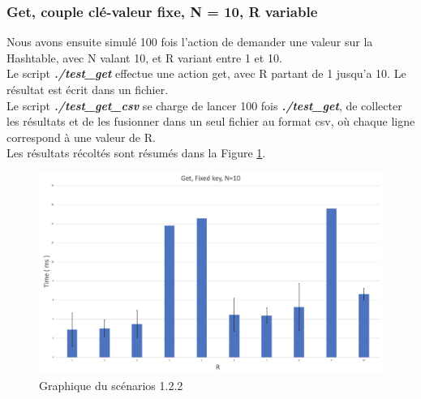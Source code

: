 \documentclass{article}
\begin{document}
\subsubsection{Get, couple clé-valeur fixe, N = 10, R variable}
Nous avons ensuite simulé 100 fois l'action de demander une valeur sur la Hashtable, avec N valant 10, et R variant entre 1 et 10.\\
Le script \textbf{\textit{./test\_get}} effectue une action get, avec R partant de 1 jusqu'a 10. Le résultat est écrit dans un fichier. \\
Le script \textbf{\textit{./test\_get\_csv}} se charge de lancer 100 fois \textbf{\textit{./test\_get}}, de collecter les résultats et de les fusionner dans un seul fichier au format csv, où chaque ligne correspond à une valeur de R. \\
Les résultats récoltés sont résumés dans la Figure \ref{figGet}. 

\begin{figure}
 	\includegraphics[scale = 0.25]{img/Get}
 	\caption{Graphique du scénarios 1.2.2}
 	\label{figGet}
\end{figure}
\end{document}
